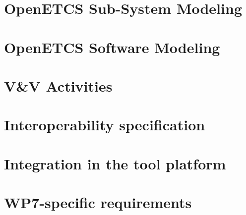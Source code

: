 \documentclass{openetcs_report}
\begin{document}


\chapter{OpenETCS Sub-System Modeling}
\label{chap:sysphase}



\chapter{OpenETCS  Software Modeling}
\label{chap:softphase}



\chapter{V\&V Activities}
\label{chap:VnV}


\chapter{Interoperability specification}
\label{chap:interope}



\chapter{Integration in the tool platform}
\label{chap:integration}







\appendix





\chapter{WP7-specific requirements}
\label{app:WP7Req}


\end{document}
